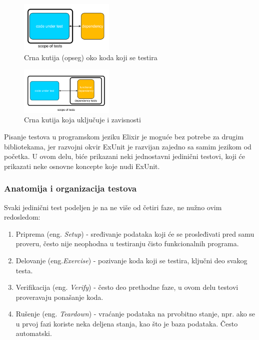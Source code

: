 \documentclass[12pt,oneside]{memoir}
\begin{document}
\begin{figure}[!ht]
  \centering
  \label{fig:box1}
  \includegraphics[width=0.4\textwidth]{box1.png}
  \caption{Crna kutija (opseg) oko koda koji se testira}
\end{figure}

\begin{figure}[!ht]
  \centering
  \label{fig:box2}
  \includegraphics[width=0.4\textwidth]{box2.png}
  \caption{Crna kutija koja uključuje i zavisnosti}
\end{figure}

\par Pisanje testova u programskom jeziku Elixir je moguće bez potrebe za drugim bibliotekama, jer razvojni okvir ExUnit je razvijan zajedno sa samim jezikom od početka. U ovom delu, biće prikazani neki jednostavni jedinični testovi, koji će prikazati neke osnovne koncepte koje nudi ExUnit. 

\subsubsection{Anatomija i organizacija testova}
Svaki jedinični test podeljen je na ne više od četiri faze, ne nužno ovim redosledom:
\begin{enumerate}
\item Priprema (eng. \emph{Setup}) - sređivanje podataka koji će se prosleđivati pred samu proveru, često nije neophodna u testiranju čisto funkcionalnih programa.
\item Delovanje (eng.\emph{Exercise}) - pozivanje koda koji se testira, ključni deo svakog testa.
\item Verifikacija (eng. \emph{Verify}) - često deo prethodne faze, u ovom delu testovi proveravaju ponašanje koda. 
\item Rušenje (eng. \emph{Teardown}) - vraćanje podataka na prvobitno stanje, npr. ako se u prvoj fazi koriste neka deljena stanja, kao što je baza podataka. Često automatski. 
\end{enumerate}
\end{document}
